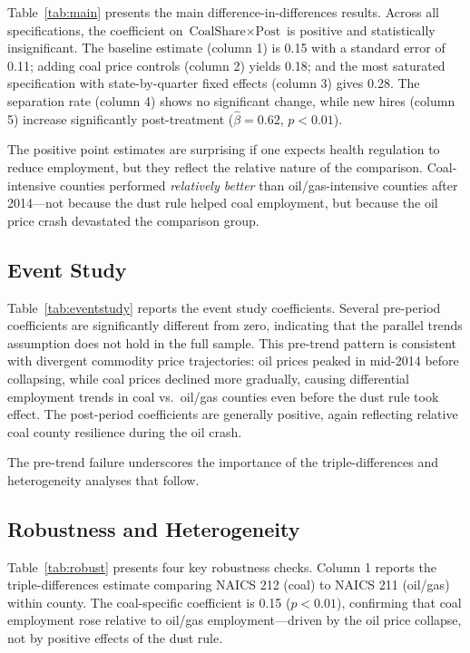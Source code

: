\documentclass[12pt]{article}
\begin{document}
Table~\ref{tab:main} presents the main difference-in-differences results. Across all specifications, the coefficient on $\text{CoalShare} \times \text{Post}$ is positive and statistically insignificant. The baseline estimate (column 1) is 0.15 with a standard error of 0.11; adding coal price controls (column 2) yields 0.18; and the most saturated specification with state-by-quarter fixed effects (column 3) gives 0.28. The separation rate (column 4) shows no significant change, while new hires (column 5) increase significantly post-treatment ($\hat{\beta} = 0.62$, $p < 0.01$).



The positive point estimates are surprising if one expects health regulation to reduce employment, but they reflect the relative nature of the comparison. Coal-intensive counties performed \emph{relatively better} than oil/gas-intensive counties after 2014---not because the dust rule helped coal employment, but because the oil price crash devastated the comparison group.

\subsection{Event Study}

Table~\ref{tab:eventstudy} reports the event study coefficients. Several pre-period coefficients are significantly different from zero, indicating that the parallel trends assumption does not hold in the full sample. This pre-trend pattern is consistent with divergent commodity price trajectories: oil prices peaked in mid-2014 before collapsing, while coal prices declined more gradually, causing differential employment trends in coal vs.\ oil/gas counties even before the dust rule took effect. The post-period coefficients are generally positive, again reflecting relative coal county resilience during the oil crash.



The pre-trend failure underscores the importance of the triple-differences and heterogeneity analyses that follow.

\subsection{Robustness and Heterogeneity}

Table~\ref{tab:robust} presents four key robustness checks. Column 1 reports the triple-differences estimate comparing NAICS 212 (coal) to NAICS 211 (oil/gas) within county. The coal-specific coefficient is 0.15 ($p < 0.01$), confirming that coal employment rose relative to oil/gas employment---driven by the oil price collapse, not by positive effects of the dust rule.
\end{document}
